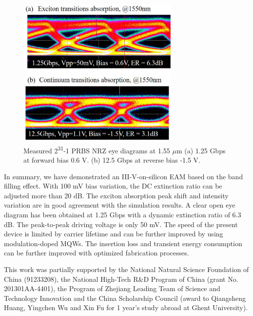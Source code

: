\documentclass[aip,apl,reprint,a4paper]{revtex4-1}
\def\SP#1{\textsuperscript{#1}}
\begin{document}
\begin{figure}
	\includegraphics[width=8cm]{figure/fig6.eps}%
	\caption{\label{fig:6} Measured 2\SP{31}-1 PRBS NRZ eye diagrams at 1.55 $\mu$m (a) 1.25 Gbps at forward bias 0.6 V.  (b) 12.5 Gbps at reverse bias -1.5 V.}
\end{figure}


In summary, we have demonstrated an III-V-on-silicon EAM based on the band filling effect. With 100 mV bias variation, the DC extinction ratio can be adjusted more than 20 dB. The exciton absorption peak shift and intensity variation are in good agreement with the simulation results. A clear open eye diagram has been obtained at 1.25 Gbps with a dynamic extinction ratio of 6.3 dB. The peak-to-peak driving voltage is only 50 mV. The speed of the present device is limited by carrier lifetime and can be further improved by using modulation-doped MQWs. The insertion loss and transient energy consumption can be further improved with optimized fabrication processes. 

\begin{acknowledgments}
This work was partially supported by the National Natural Science Foundation of China (91233208), the National High-Tech R\&D Program of China (grant No. 201301AA-4401), the Program of Zhejiang Leading Team of Science and Technology Innovation and the China Scholarship Council (award to Qiangsheng Huang, Yingchen Wu and Xin Fu for 1 year’s study abroad at Ghent University).
\end{acknowledgments}


\end{document}

